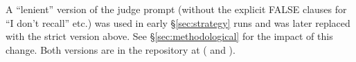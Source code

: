 A ``lenient'' version of the judge prompt (without the explicit FALSE
clauses for ``I don't recall'' etc.) was used in early \S\ref{sec:strategy} runs and was
later replaced with the strict version above. See \S\ref{sec:methodological} for the impact of
this change. Both versions are in the repository at
 ( and
).
